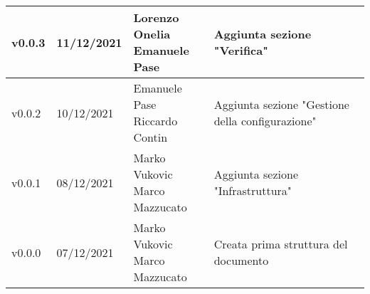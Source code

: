 \begin{center}
\begin{tabular}{|p{2cm}|p{2cm}|p{4cm}|p{5cm}|}
    v0.0.3            & 11/12/2021    & \aCapo{Lorenzo Onelia\\Emanuele Pase} & Aggiunta sezione "Verifica" \\ \hline
    v0.0.2            & 10/12/2021    & \aCapo{Emanuele Pase\\Riccardo Contin}  & Aggiunta sezione "Gestione della configurazione" \\ \hline
    v0.0.1            & 08/12/2021    & \aCapo{Marko Vukovic\\Marco Mazzucato}   & Aggiunta sezione "Infrastruttura" \\ \hline
    v0.0.0            & 07/12/2021    & \aCapo{Marko Vukovic\\Marco Mazzucato}   & Creata prima struttura del documento \\ \hline
  \end{tabular}
\end{center}
